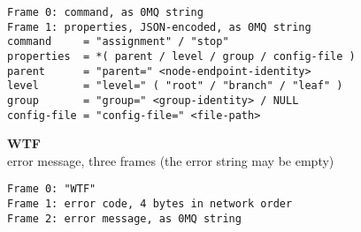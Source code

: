 \begin{verbatim}
Frame 0: command, as 0MQ string
Frame 1: properties, JSON-encoded, as 0MQ string
command     = "assignment" / "stop"
properties  = *( parent / level / group / config-file )
parent      = "parent=" <node-endpoint-identity>
level       = "level=" ( "root" / "branch" / "leaf" )
group       = "group=" <group-identity> / NULL
config-file = "config-file=" <file-path>
\end{verbatim}

\textbf{WTF} \\
error message, three frames (the error string may be empty)

\begin{verbatim}
Frame 0: "WTF"
Frame 1: error code, 4 bytes in network order
Frame 2: error message, as 0MQ string
\end{verbatim}
